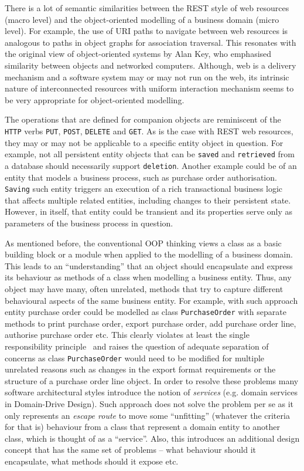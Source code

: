 \documentclass[a4paper,12pt,oneside,openright,final]{memoir} %
\begin{document}
	There is a lot of semantic similarities between the REST style of web resources (macro level) and the object-oriented modelling of a business domain (micro level).
  	For example, the use of URI paths to navigate between web resources is analogous to paths in object graphs for association traversal.
  	This resonates with the original view of object-oriented systems by Alan Key, who emphasised similarity between objects and networked computers.
  	Although, web is a delivery mechanism and a software system may or may not run on the web, its intrinsic nature of interconnected resources with uniform interaction mechanism seems to be very appropriate for object-oriented modelling.

	The operations that are defined for companion objects are reminiscent of the \texttt{HTTP} verbs \texttt{PUT}, \texttt{POST}, \texttt{DELETE} and \texttt{GET}.
	As is the case with REST web resources, they may or may not be applicable to a specific entity object in question.
	For example, not all persistent entity objects that can be \texttt{saved} and \texttt{retrieved} from a database should necessarily support \texttt{deletion}.
	Another example could be of an entity that models a business process, such as purchase order authorisation.
	\texttt{Saving} such entity triggers an execution of a rich transactional business logic that affects multiple related entities, including changes to their persistent state.
	However, in itself, that entity could be transient and its properties serve only as parameters of the business process in question.
	
	As mentioned before, the conventional OOP thinking views a class as a basic building block or a module when applied to the modelling of a business domain.
	This leads to an ``understanding'' that an object should encapsulate and express its behaviour as methods of a class when modelling a business entity. 
	Thus, any object may have many, often unrelated, methods that try to capture different behavioural aspects of the same business entity.
	For example, with such approach entity purchase order could be modelled as class \texttt{PurchaseOrder} with separate methods to print purchase order, export purchase order, add purchase order line, authorise purchase order etc.
	This clearly violates at least the single responsibility principle~\cite{SOLID} and raises the question of adequate separation of concerns as class \texttt{PurchaseOrder} would need to be modified for multiple unrelated reasons such as changes in the export format requirements or the structure of a purchase order line object.
	In order to resolve these problems many software architectural styles introduce the notion of \emph{services} (e.g. domain services in Domain-Drive Design).
	Such approach does not solve the problem per se as it only represents an \emph{escape route} to move some ``unfitting'' (whatever the criteria for that is) behaviour from a class that represent a domain entity to another class, which is thought of as a ``service''.
	Also, this introduces an additional design concept that has the same set of problems -- what behaviour should it encapsulate, what methods should it expose etc.
	
\end{document}
